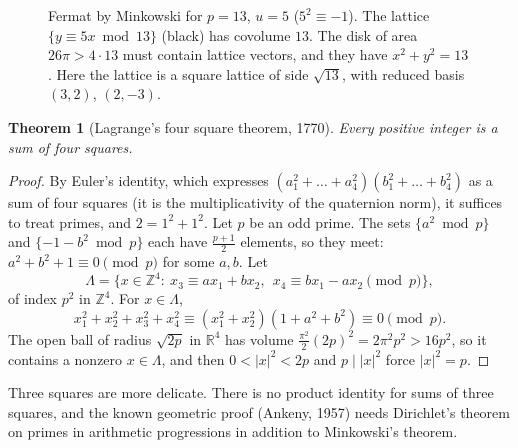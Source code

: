 \documentclass[11pt,openany]{book}
\theoremstyle{plain}
\newtheorem{theorem}{Theorem}[chapter]
\theoremstyle{definition}
\theoremstyle{remark}
\newcommand{\R}{\mathbb{R}}
\newcommand{\Z}{\mathbb{Z}}
\newcommand{\Lat}{\Lambda}             %
\newcommand{\abs}[1]{\left\lvert #1 \right\rvert}
\begin{document}
\begin{figure}[ht]
\centering
{}
\caption{Fermat by Minkowski for $p=13$, $u=5$ ($5^2\equiv-1$). The lattice
$\{y\equiv5x\bmod13\}$ (black) has covolume $13$. The disk of area $26\pi>4\cdot13$ must contain
lattice vectors, and they have $x^2+y^2=13$. Here the lattice is a square lattice of side $\sqrt{13}$,
with reduced basis $(3,2)$, $(2,-3)$.}
\label{NT:fig:fermat}
\end{figure}

\begin{theorem}[Lagrange's four square theorem, 1770]\label{NT:thm:lagrange4}
Every positive integer is a sum of four squares.
\end{theorem}

\begin{proof}
By Euler's identity, which expresses $(a_1^2+\dots+a_4^2)(b_1^2+\dots+b_4^2)$ as a sum of four squares
(it is the multiplicativity of the quaternion norm), it suffices to treat primes, and $2=1^2+1^2$. Let
$p$ be an odd prime. The sets $\{a^2\bmod p\}$ and $\{-1-b^2\bmod p\}$ each have $\frac{p+1}2$
elements, so they meet: $a^2+b^2+1\equiv0\pmod p$ for some $a,b$. Let
\[
  \Lat=\{x\in\Z^4:\ x_3\equiv ax_1+bx_2,\ \ x_4\equiv bx_1-ax_2\pmod p\},
\]
of index $p^2$ in $\Z^4$. For $x\in\Lat$,
\[
  x_1^2+x_2^2+x_3^2+x_4^2\equiv(x_1^2+x_2^2)(1+a^2+b^2)\equiv0\pmod p .
\]
The open ball of radius $\sqrt{2p}$ in $\R^4$ has volume $\frac{\pi^2}{2}(2p)^2=2\pi^2p^2>16p^2$, so
it contains a nonzero $x\in\Lat$, and then $0<\abs x^2<2p$ and $p\mid\abs x^2$ force $\abs x^2=p$.
\end{proof}

Three squares are more delicate. There is no product identity for sums of three squares, and the known
geometric proof (Ankeny, 1957) needs Dirichlet's theorem on primes in arithmetic progressions in
addition to Minkowski's theorem.
\end{document}
